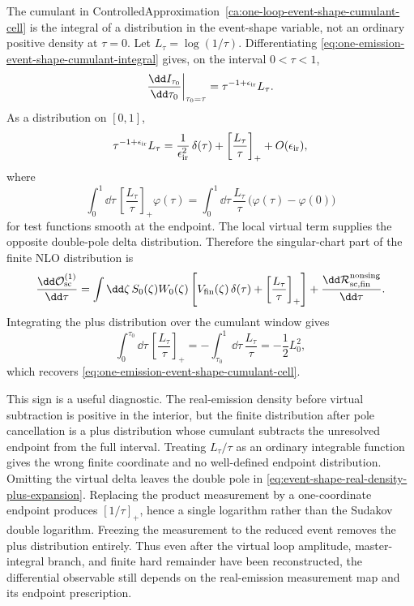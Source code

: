 \begin{controlledapproximation}
\label{ca:one-loop-event-shape-plus-distribution}
The cumulant in
ControlledApproximation~\ref{ca:one-loop-event-shape-cumulant-cell} is the
integral of a distribution in the event-shape variable, not an ordinary
positive density at \(\tau=0\).  Let \(L_\tau=\log(1/\tau)\).  Differentiating
\eqref{eq:one-emission-event-shape-cumulant-integral} gives, on the interval
\(0<\tau<1\),
\[
  \frac{\dd I_{\tau_0}}{\dd\tau_0}\bigg|_{\tau_0=\tau}
  =
  \tau^{-1+\epsilon_{\rm ir}}L_\tau .
\]
As a distribution on \([0,1]\),
\begin{equation}
  \tau^{-1+\epsilon_{\rm ir}}L_\tau
  =
  \frac1{\epsilon_{\rm ir}^2}\,\delta(\tau)
  +
  \left[\frac{L_\tau}{\tau}\right]_+
  +O(\epsilon_{\rm ir}),
  \label{eq:event-shape-real-density-plus-expansion}
\end{equation}
where
\[
  \int_0^1\dd\tau\,
  \left[\frac{L_\tau}{\tau}\right]_+\varphi(\tau)
  =
  \int_0^1\dd\tau\,
  \frac{L_\tau}{\tau}\,
  \bigl(\varphi(\tau)-\varphi(0)\bigr)
\]
for test functions smooth at the endpoint.  The local virtual term supplies
the opposite double-pole delta distribution.  Therefore the singular-chart
part of the finite NLO distribution is
\begin{equation}
  \frac{\dd\mathcal O_{\rm sc}^{(1)}}{\dd\tau}
  =
  \int\dd\zeta\,S_0(\zeta)W_0(\zeta)
  \left[
    V_{\rm fin}(\zeta)\,\delta(\tau)
    +
    \left[\frac{L_\tau}{\tau}\right]_+
  \right]
  +
  \frac{\dd\mathcal R_{{\rm sc},\rm fin}^{\rm nonsing}}{\dd\tau}.
  \label{eq:event-shape-finite-plus-distribution}
\end{equation}
Integrating the plus distribution over the cumulant window gives
\[
  \int_0^{\tau_0}\dd\tau\,
  \left[\frac{L_\tau}{\tau}\right]_+
  =
  -
  \int_{\tau_0}^{1}\dd\tau\,\frac{L_\tau}{\tau}
  =
  -\frac12L_0^2,
\]
which recovers
\eqref{eq:one-emission-event-shape-cumulant-cell}.

This sign is a useful diagnostic.  The real-emission density before virtual
subtraction is positive in the interior, but the finite distribution after
pole cancellation is a plus distribution whose cumulant subtracts the
unresolved endpoint from the full interval.  Treating \(L_\tau/\tau\) as an
ordinary integrable function gives the wrong finite coordinate and no
well-defined endpoint distribution.  Omitting the virtual delta leaves the
double pole in \eqref{eq:event-shape-real-density-plus-expansion}.  Replacing
the product measurement by a one-coordinate endpoint produces
\([1/\tau]_+\), hence a single logarithm rather than the Sudakov double
logarithm.  Freezing the measurement to the reduced event removes the plus
distribution entirely.  Thus even after the virtual loop amplitude,
master-integral branch, and finite hard remainder have been reconstructed, the
differential observable still depends on the real-emission measurement map and
its endpoint prescription.
\end{controlledapproximation}


